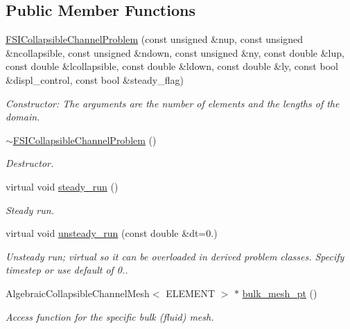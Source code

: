 \subsection*{Public Member Functions}
\begin{DoxyCompactItemize}
\item 
\hyperlink{classFSICollapsibleChannelProblem_a74efdd9ed027ab0ca5cf59ec8da6b95c}{F\+S\+I\+Collapsible\+Channel\+Problem} (const unsigned \&nup, const unsigned \&ncollapsible, const unsigned \&ndown, const unsigned \&ny, const double \&lup, const double \&lcollapsible, const double \&ldown, const double \&ly, const bool \&displ\+\_\+control, const bool \&steady\+\_\+flag)
\begin{DoxyCompactList}\small\item\em Constructor\+: The arguments are the number of elements and the lengths of the domain. \end{DoxyCompactList}\item 
\hyperlink{classFSICollapsibleChannelProblem_abe33aaaae15ea3eb10885527a1d1ad9a}{$\sim$\+F\+S\+I\+Collapsible\+Channel\+Problem} ()
\begin{DoxyCompactList}\small\item\em Destructor. \end{DoxyCompactList}\item 
virtual void \hyperlink{classFSICollapsibleChannelProblem_a299ba7d5819e7871eae7e331d1abab8b}{steady\+\_\+run} ()
\begin{DoxyCompactList}\small\item\em Steady run. \end{DoxyCompactList}\item 
virtual void \hyperlink{classFSICollapsibleChannelProblem_ae4f2b3abaf5e2dfc35489548d5a72edc}{unsteady\+\_\+run} (const double \&dt=0.)
\begin{DoxyCompactList}\small\item\em Unsteady run; virtual so it can be overloaded in derived problem classes. Specify timestep or use default of 0.. \end{DoxyCompactList}\item 
Algebraic\+Collapsible\+Channel\+Mesh$<$ E\+L\+E\+M\+E\+NT $>$ $\ast$ \hyperlink{classFSICollapsibleChannelProblem_a9b461f3afef3185ea0b461714675ef8f}{bulk\+\_\+mesh\+\_\+pt} ()
\begin{DoxyCompactList}\small\item\em Access function for the specific bulk (fluid) mesh. \end{DoxyCompactList}\item 

\end{DoxyCompactItemize}
